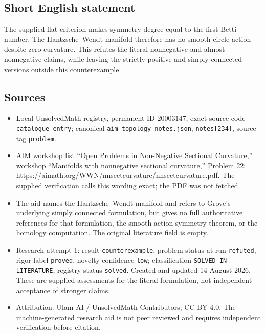 \documentclass[11pt]{article}
\begin{document}
\subsection{Short English statement}
The supplied flat criterion makes symmetry degree equal to the first Betti number. The Hantzsche--Wendt manifold therefore has no smooth circle action despite zero curvature. This refutes the literal nonnegative and almost-nonnegative claims, while leaving the strictly positive and simply connected versions outside this counterexample.
\subsection{Sources}
\begin{itemize}
\item Local UnsolvedMath registry, permanent ID \(20003147\), exact source code \texttt{catalogue entry}; canonical \texttt{aim-topology-notes.json}, \texttt{notes[234]}, source tag \texttt{problem}.
\item AIM workshop list ``Open Problems in Non-Negative Sectional Curvature,'' workshop ``Manifolds with nonnegative sectional curvature,'' Problem 22: \url{https://aimath.org/WWN/nnsectcurvature/nnsectcurvature.pdf}. The supplied verification calls this wording exact; the PDF was not fetched.
\item The aid names the Hantzsche--Wendt manifold and refers to Grove's underlying simply connected formulation, but gives no full authoritative references for that formulation, the smooth-action symmetry theorem, or the homology computation. The original literature field is empty.
\item Research attempt 1: result \texttt{counterexample}, problem status at run \texttt{refuted}, rigor label \texttt{proved}, novelty confidence \texttt{low}; classification \texttt{SOLVED-IN-LITERATURE}, registry status \texttt{solved}. Created and updated 14 August 2026. These are supplied assessments for the literal formulation, not independent acceptance of stronger claims.
\item Attribution: Ulam AI / UnsolvedMath Contributors, CC BY 4.0. The machine-generated research aid is not peer reviewed and requires independent verification before citation.
\end{itemize}
\end{document}
